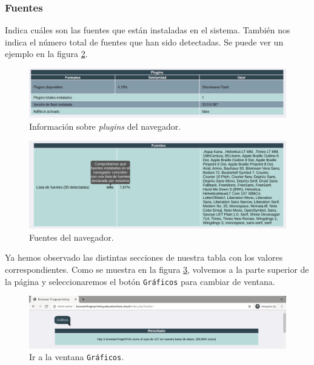 \subsubsection{Fuentes}
Indica cuáles son las fuentes que están instaladas en el sistema. También nos indica el número total de fuentes que han sido detectadas. Se puede ver un ejemplo en la figura \ref{fig:fuentesSection}.

\begin{figure}[tbp]
	\centering
	\includegraphics[width=1\textwidth]{Images/pluginsSection.jpg}
	\caption{Información sobre \textit{plugins} del navegador.}
	\label{fig:pluginsSection}
\end{figure}

\begin{figure}[tbp]
	\centering
	\includegraphics[width=1\textwidth]{Images/fuentesSection.png}
	\caption{Fuentes del navegador.}
	\label{fig:fuentesSection}
\end{figure}

Ya hemos observado las distintas secciones de nuestra tabla con los valores correspondientes. Como se muestra en la figura \ref{fig:graficosBoton}, volvemos a la parte superior de la página y seleccionaremos el botón \texttt{Gráficos} para cambiar de ventana.

\begin{figure}[tbp]
	\centering
	\includegraphics[width=1\textwidth]{Images/graficosBoton.png}
	\caption{Ir a la ventana \texttt{Gráficos}.}
	\label{fig:graficosBoton}
\end{figure}


